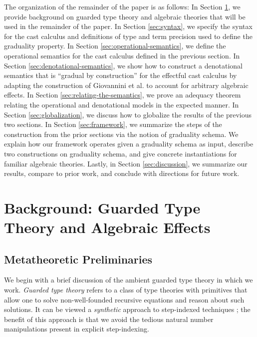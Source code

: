 \documentclass[acmsmall,screen,review,anonymous]{acmart}
\theoremstyle{remark}
\begin{document}
The organization of the remainder of the paper is as follows:
In Section \ref{sec:background}, we provide background on guarded type theory
and algebraic theories that will be used in the remainder of the paper. In
Section \ref{sec:syntax}, we specify the syntax for the cast calculus and
definitions of type and term precision used to define the graduality property.
In Section \ref{sec:operational-semantics}, we define the operational
semantics for the cast calculus defined in the previous section. In Section
\ref{sec:denotational-semantics}, we show how to construct a denotational
semantics that is ``gradual by construction'' for the effectful cast calculus
by adapting the construction of Giovannini et al. \cite{gtt-sgdt} to account
for arbitrary algebraic effects. In Section \ref{sec:relating-the-semantics},
we prove an adequacy theorem relating the operational and denotational models
in the expected manner. In Section \ref{sec:globalization}, we discuss how to
globalize the results of the previous two sections. In Section
\ref{sec:framework}, we summarize the steps of the construction from the prior
sections via the notion of graduality schema. We explain how our framework
operates given a graduality schema as input, describe two constructions on
graduality schema, and give concrete instantiations for familiar algebraic
theories. Lastly, in Section \ref{sec:discussion}, we summarize our results,
compare to prior work, and conclude with directions for future work.

\section{Background: Guarded Type Theory and Algebraic Effects}\label{sec:background}

\subsection{Metatheoretic Preliminaries}

We begin with a brief discussion of the ambient guarded type theory in which we
work. \emph{Guarded type theory} refers to a class of type theories with
primitives that allow one to solve non-well-founded recursive equations and
reason about such solutions. It can be viewed a \emph{synthetic} approach to
step-indexed techniques \cite{birkedal-mogelberg-schwinghammer-stovring2011};
the benefit of this approach is that we avoid the tedious natural number
manipulations present in explicit step-indexing.
\end{document}
